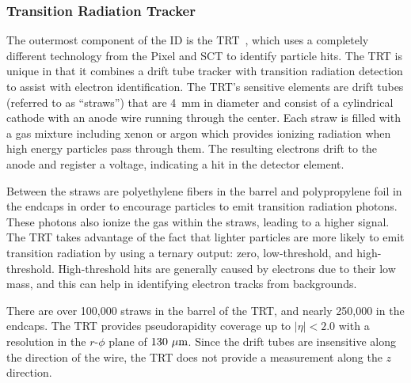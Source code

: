 \subsubsection{Transition Radiation Tracker} \label{sec:trt}
The outermost component of the ID is the TRT~\cite{2008.trt-tubes, 2008.trt-barrel, 2008.trt-endcap}, which uses a completely different technology from the Pixel and SCT to identify particle hits.
The TRT is unique in that it combines a drift tube tracker with transition radiation detection to assist with electron identification.
The TRT's sensitive elements are drift tubes (referred to as ``straws'') that are 4~mm in diameter and consist of a cylindrical cathode with an anode wire running through the center.
Each straw is filled with a gas mixture including xenon or argon which provides ionizing radiation when high energy particles pass through them.
The resulting electrons drift to the anode and register a voltage, indicating a hit in the detector element.

Between the straws are polyethylene fibers in the barrel and polypropylene foil in the endcaps in order to encourage particles to emit transition radiation photons.
These photons also ionize the gas within the straws, leading to a higher signal.
The TRT takes advantage of the fact that lighter particles are more likely to emit transition radiation by using a ternary output: zero, low-threshold, and high-threshold.
High-threshold hits are generally caused by electrons due to their low mass, and this can help in identifying electron tracks from backgrounds. 

There are over 100,000 straws in the barrel of the TRT, and nearly 250,000 in the endcaps.
The TRT provides pseudorapidity coverage up to $|\eta| < 2.0$ with a resolution in the $r$-$\phi$ plane of $130~\mu\textrm{m}$.
Since the drift tubes are insensitive along the direction of the wire, the TRT does not provide a measurement along the $z$ direction.
